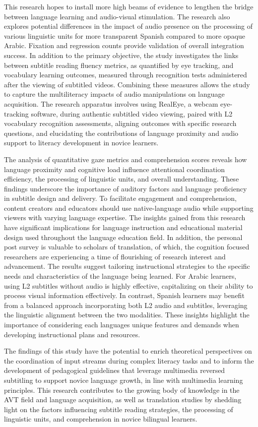This research hopes to install more high beams of evidence to lengthen
the bridge between language learning and audio-visual stimulation. The
research also explores potential differences in the impact of audio
presence on the processing of various linguistic units for more
transparent Spanish compared to more opaque Arabic. Fixation and
regression counts provide validation of overall integration success. In
addition to the primary objective, the study investigates the links
between subtitle reading fluency metrics, as quantified by eye tracking,
and vocabulary learning outcomes, measured through recognition tests
administered after the viewing of subtitled videos. Combining these
measures allows the study to capture the multiliteracy impacts of audio
manipulations on language acquisition. The research apparatus involves
using RealEye, a webcam eye-tracking software, during authentic
subtitled video viewing, paired with L2 vocabulary recognition
assessments, aligning outcomes with specific research questions, and
elucidating the contributions of language proximity and audio support to
literacy development in novice learners.

The analysis of quantitative gaze metrics and comprehension scores
reveals how language proximity and cognitive load influence attentional
coordination efficiency, the processing of linguistic units, and overall
understanding. These findings underscore the importance of auditory
factors and language proficiency in subtitle design and delivery. To
facilitate engagement and comprehension, content creators and educators
should use native-language audio while supporting viewers with varying
language expertise. The insights gained from this research have
significant implications for language instruction and educational
material design used throughout the language education field. In
addition, the personal post survey is valuable to scholars of
translation, of which, the cognition focused researchers are
experiencing a time of flourishing of research interest and advancement.
The results suggest tailoring instructional strategies to the specific
needs and characteristics of the language being learned. For Arabic
learners, using L2 subtitles without audio is highly effective,
capitalizing on their ability to process visual information effectively.
In contrast, Spanish learners may benefit from a balanced approach
incorporating both L2 audio and subtitles, leveraging the linguistic
alignment between the two modalities. These insights highlight the
importance of considering each language\textquotesingle s unique
features and demands when developing instructional plans and resources.

The findings of this study have the potential to enrich theoretical
perspectives on the coordination of input streams during complex
literacy tasks and to inform the development of pedagogical guidelines
that leverage multimedia reversed subtitling to support novice language
growth, in line with multimedia learning principles. This research
contributes to the growing body of knowledge in the AVT field and
language acquisition, as well as translation studies by shedding light
on the factors influencing subtitle reading strategies, the processing
of linguistic units, and comprehension in novice bilingual learners.